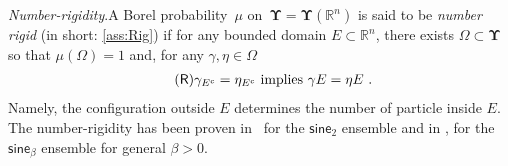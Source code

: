 \documentclass[11pt,letterpaper]{amsart}
\newcommand{\R}{{\mathbb R}}
\newcommand{\fstop}{\,\,\mathrm{.}}
\newcommand{\QP}{{\mu}}
\newcommand{\dUpsilon}{{\mathbf \Upsilon}}
\newcommand{\U}{\dUpsilon}
\newcommand{\sine}{\mathsf{sine}}
\renewcommand{\1}{\mathbf 1}
\numberwithin{equation}{section}
\theoremstyle{plain}
\theoremstyle{definition}
\theoremstyle{remark}
\newtheorem{ese}[thm]{\bf Example}%
\renewcommand{\paragraph}[1]{\medskip\emph{#1}.\quad}
\begin{document}
\paragraph{Number-rigidity}A Borel probability~$\mu$ on~$\U=\U(\R^n)$ is said to be {\it number rigid} (in short: \ref{ass:Rig}) if for any bounded domain $E \subset \R^n$, there exists $\Omega \subset \dUpsilon$ so that $\QP(\Omega)=1$  and, for any $\gamma, \eta \in \Omega$
\begin{align*}\tag*{$(\mathsf{R})$}\label{ass:Rig}
\text{$\gamma_{E^c} = \eta_{E^c}$ implies $\gamma E = \eta E$}  \fstop
\end{align*}
Namely, the configuration outside $E$ determines the number of particle inside $E$. The number-rigidity has been proven in~\cite{Gho15} for the $\sine_2$ ensemble and in \cite{NajRed18}, \cite{DerHarLebMai20} for the $\sine_\beta$ ensemble for general $\beta>0$.
%
\end{document}
